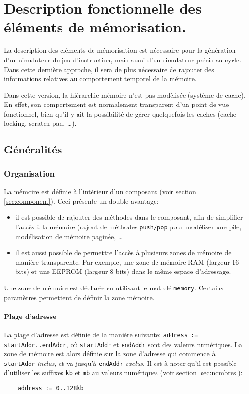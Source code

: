 \chapter{Description fonctionnelle des éléments de mémorisation.}
\label{sec:mem_program}

La description des éléments de mémorisation est nécessaire pour la génération d'un simulateur de jeu d'instruction, mais aussi d'un simulateur précis au cycle. Dans cette dernière approche, il sera de plus nécessaire de rajouter des informations relatives au comportement temporel de la mémoire.

Dans cette version, la hiérarchie mémoire n'est pas modélisée (système de cache). En effet, son comportement est normalement transparent d'un point de vue fonctionnel, bien qu'il y ait la possibilité de gérer quelquefois les caches (cache locking, scratch pad, \ldots).

\section{Généralités}
\subsection{Organisation}
La mémoire est définie à l'intérieur d'un composant (voir section \ref{sec:component}). Ceci présente un double avantage:
\begin{itemize}
\item il est possible de rajouter des méthodes dans le composant, afin de simplifier l'accès à la mémoire (rajout de méthodes \texttt{push/pop} pour modéliser une pile, modélisation de mémoire paginée, \ldots
\item il est aussi possible de permettre l'accès à plusieurs zones de mémoire de manière transparente. Par exemple, une zone de mémoire RAM (largeur 16 bits) et une EEPROM (largeur 8 bits) dans le même espace d'adressage.
\end{itemize}

Une zone de mémoire est déclarée en utilisant le mot clé \texttt{memory}. Certains paramètres permettent de définir la zone mémoire. 

\subsubsection{Plage d'adresse}
La plage d'adresse est définie de la manière suivante: \texttt{address := startAddr..endAddr}, où \texttt{startAddr} et \texttt{endAddr} sont des valeurs numériques. La zone de mémoire est alors définie sur la zone d'adresse qui commence à \texttt{startAddr} \emph{inclus}, et va jusqu'à \texttt{endAddr} \emph{exclus}. Il est à noter qu'il est possible d'utiliser les suffixes \texttt{kb} et \texttt{mb} au valeurs numériques (voir section
\ref{sec:nombres}):
\begin{lstlisting}
    address := 0..128kb  
\end{lstlisting}


